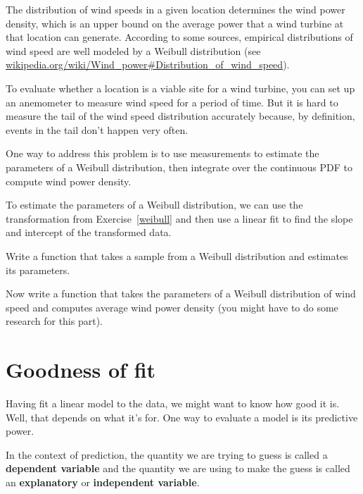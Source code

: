\documentclass[12pt]{book}
\begin{document}
\begin{ex}

The distribution of wind speeds in a given location determines the
wind power density, which is an upper bound on the average power that
a wind turbine at that location can generate.  According to some
sources, empirical distributions of wind speed are well modeled by a
Weibull distribution (see
\url{wikipedia.org/wiki/Wind_power#Distribution_of_wind_speed}).


To evaluate whether a location is a viable site for a wind turbine,
you can set up an anemometer to measure wind speed for a period of
time.  But it is hard to measure the tail of the wind speed distribution
accurately because, by definition, events in the tail don't happen
very often.

One way to address this problem is to use measurements to estimate the
parameters of a Weibull distribution, then integrate over the
continuous PDF to compute wind power density.

To estimate the parameters of a Weibull distribution, we can use the
transformation from Exercise~\ref{weibull} and then use a linear fit
to find the slope and intercept of the transformed data.

Write a function that takes a sample from a Weibull distribution and
estimates its parameters.

Now write a function that takes the parameters of a Weibull distribution
of wind speed and computes average wind power density (you might have
to do some research for this part).

\end{ex}


\section{Goodness of fit}

Having fit a linear model to the data, we might want to know how good
it is.  Well, that depends on what it's for.  One way to evaluate a
model is its predictive power.

In the context of prediction, the quantity we are trying to guess is
called a {\bf dependent variable} and the quantity we are using to
make the guess is called an {\bf explanatory} or {\bf independent
  variable}.

\end{document}

